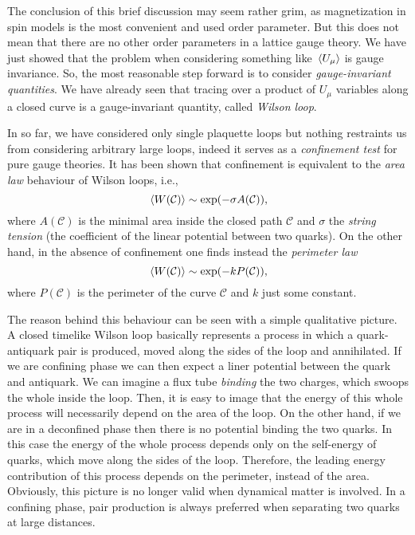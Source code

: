 The conclusion of this brief discussion may seem rather grim, as magnetization in spin models is the most convenient and used order parameter.
But this does not mean that there are no other order parameters in a lattice gauge theory.
We have just showed that the problem when considering something like $\ev*{U_{\mu}}$ is gauge invariance.
So, the most reasonable step forward is to consider \emph{gauge-invariant quantities}.
We have already seen that tracing over a product of $U_{\mu}$ variables along a closed curve is a gauge-invariant quantity, called \emph{Wilson loop}.

In so far, we have considered only single plaquette loops but nothing restraints us from considering arbitrary large loops, indeed it serves as a \emph{confinement test} for pure gauge theories.
It has been shown \citneeded that confinement is equivalent to the \emph{area law} behaviour of Wilson loops, i.e.,
\begin{equation}
    \ev*{W(\mathcal{C})} \sim \exp(- \sigma A(\mathcal{C})),
    \label{eq:wilson_area_law}
\end{equation}
where $A(\mathcal{C})$ is the minimal area inside the closed path $\mathcal{C}$ and $\sigma$ the \emph{string tension} (the coefficient of the linear potential between two quarks).
On the other hand, in the absence of confinement one finds instead the \emph{perimeter law}
\begin{equation}
    \ev*{W(\mathcal{C})} \sim \exp(- k P(\mathcal{C})),
    \label{eq:wilson_perimeter_law}
\end{equation}
where $P(\mathcal{C})$ is the perimeter of the curve $\mathcal{C}$ and $k$ just some constant.

The reason behind this behaviour can be seen with a simple qualitative picture.
A closed timelike Wilson loop basically represents a process in which a quark-antiquark pair is produced, moved along the sides of the loop and annihilated.
If we are confining phase we can then expect a liner potential between the quark and antiquark.
We can imagine a flux tube \emph{binding} the two charges, which swoops the whole inside the loop.
Then, it is easy to image that the energy of this whole process will necessarily depend on the area of the loop.
On the other hand, if we are in a deconfined phase then there is no potential binding the two quarks.
In this case the energy of the whole process depends only on the self-energy of quarks, which move along the sides of the loop.
Therefore, the leading energy contribution of this process depends on the perimeter, instead of the area.
Obviously, this picture is no longer valid when dynamical matter is involved.
In a confining phase, pair production is always preferred when separating two quarks at large distances.

